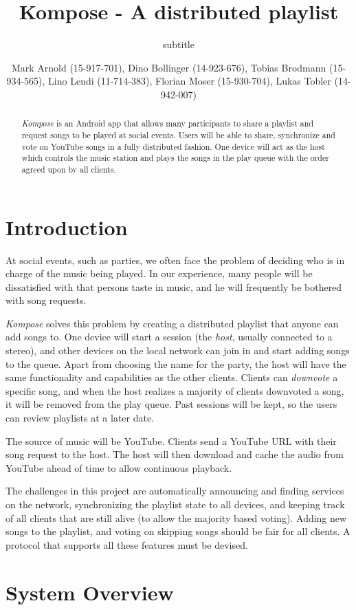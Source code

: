 \documentclass{report}
\title{Kompose - A distributed playlist}
\subtitle{subtitle}
\author{
%
%
    \alignauthor \normalsize{Mark Arnold (15-917-701), Dino Bollinger (14-923-676), Tobias Brodmann (15-934-565), Lino Lendi (11-714-383), Florian Moser (15-930-704), Lukas Tobler (14-942-007)}\\
	\email{\normalsize{arnomark@student.ethz.ch, bdino@student.ethz.ch, brotobia@student.ethz.ch, llendi@student.ethz.ch, moserfl@studen.ethz.ch, lutobler@student.ethz.ch}}
}
\begin{document}
\maketitle

\begin{abstract}
\emph{Kompose} is an Android app that allows many participants to share a playlist and
request songs to be played at social events. Users will be able to share,
synchronize and vote on YouTube songs in a fully distributed fashion. One device will
act as the host which controls the music station and plays the songs in the play queue
with the order agreed upon by all clients.
\end{abstract}

\section{Introduction}
At social events, such as parties, we often face the problem of deciding who is
in charge of the music being played. In our experience, many people will be
dissatisfied with that persons taste in music, and he will frequently be
bothered with song requests.

\emph{Kompose} solves this problem by creating a distributed playlist that anyone
can add songs to. One device will start a session (the \emph{host}, usually connected
to a stereo), and other devices on the local network can join in and start
adding songs to the queue.  Apart from choosing the name for the party,
the host will have the same functionality and capabilities as the other clients.
Clients can \emph{downvote} a specific song, and when the host realizes
a majority of clients downvoted a song, it will be removed from the play queue.  
Past sessions will be kept, so the users can review playlists at a later date.

The source of music will be YouTube. Clients send a YouTube URL with
their song request to the host. The host will then download and cache the
audio from YouTube ahead of time to allow continuous playback.

The challenges in this project are automatically announcing and finding
services on the network, synchronizing the playlist state to all devices,
and keeping track of all clients that are still alive (to allow the majority based voting). 
Adding new songs to the playlist, and voting on skipping songs should be fair 
for all clients. A protocol that supports all these features must be devised.

\section{System Overview}
\end{document}
